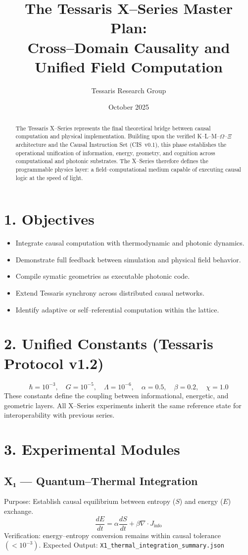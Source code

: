 \documentclass[11pt,a4paper]{article}
\title{\textbf{The Tessaris X--Series Master Plan:\\Cross--Domain Causality and Unified Field Computation}}
\author{Tessaris Research Group}
\date{October 2025}
\begin{document}
\maketitle

\begin{abstract}
The Tessaris X--Series represents the final theoretical bridge between causal computation and physical implementation.  
Building upon the verified K--L--M--$\Omega$--$\Xi$ architecture and the Causal Instruction Set (CIS~v0.1), this phase establishes the operational unification of information, energy, geometry, and cognition across computational and photonic substrates.  
The X--Series therefore defines the programmable physics layer: a field--computational medium capable of executing causal logic at the speed of light.
\end{abstract}

\section{1. Objectives}
\begin{itemize}
  \item Integrate causal computation with thermodynamic and photonic dynamics.
  \item Demonstrate full feedback between simulation and physical field behavior.
  \item Compile symatic geometries as executable photonic code.
  \item Extend Tessaris synchrony across distributed causal networks.
  \item Identify adaptive or self--referential computation within the lattice.
\end{itemize}

\section{2. Unified Constants (Tessaris Protocol v1.2)}
\[
\hbar = 10^{-3}, \quad G = 10^{-5}, \quad \Lambda = 10^{-6}, \quad
\alpha = 0.5, \quad \beta = 0.2, \quad \chi = 1.0
\]
These constants define the coupling between informational, energetic, and geometric layers.  
All X--Series experiments inherit the same reference state for interoperability with previous series.

\section{3. Experimental Modules}
\subsection*{X₁ — Quantum--Thermal Integration}
Purpose: Establish causal equilibrium between entropy ($S$) and energy ($E$) exchange.
\[
\frac{dE}{dt} = \alpha \frac{dS}{dt} + \beta \nabla\!\cdot\!J_{\mathrm{info}}
\]
Verification: energy--entropy conversion remains within causal tolerance $(<10^{-3})$.  
Expected Output: \texttt{X1\_thermal\_integration\_summary.json}
\end{document}
